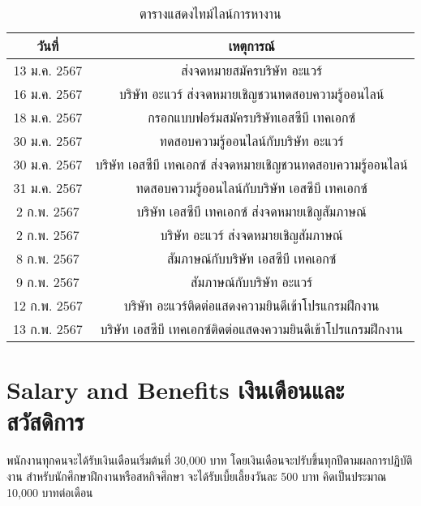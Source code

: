 \begin{table}[H]
    \centering
    \begin{tabular}{c||c}
        \textbf{วันที่} & \textbf{เหตุการณ์} \\ \hline
        13 ม.ค. 2567 & ส่งจดหมายสมัครบริษัท อะแวร์ \\ \hline
        16 ม.ค. 2567 & บริษัท อะแวร์ ส่งจดหมายเชิญชวนทดสอบความรู้ออนไลน์ \\\hline
        18 ม.ค. 2567 & กรอกแบบฟอร์มสมัครบริษัทเอสซีบี เทคเอกซ์ \\ \hline
        30 ม.ค. 2567 & ทดสอบความรู้ออนไลน์กับบริษัท อะแวร์ \\\hline
        30 ม.ค. 2567 & บริษัท เอสซีบี เทคเอกซ์ ส่งจดหมายเชิญชวนทดสอบความรู้ออนไลน์ \\\hline
        31 ม.ค. 2567 & ทดสอบความรู้ออนไลน์กับบริษัท เอสซีบี เทคเอกซ์ \\\hline
        2 ก.พ. 2567 & บริษัท เอสซีบี เทคเอกซ์ ส่งจดหมายเชิญสัมภาษณ์ \\ \hline
        2 ก.พ. 2567 & บริษัท อะแวร์ ส่งจดหมายเชิญสัมภาษณ์ \\ \hline
        8 ก.พ. 2567 & สัมภาษณ์กับบริษัท เอสซีบี เทคเอกซ์ \\ \hline
        9 ก.พ. 2567 & สัมภาษณ์กับบริษัท อะแวร์ \\ \hline
        12 ก.พ. 2567& บริษัท อะแวร์ติดต่อแสดงความยินดีเข้าโปรแกรมฝึกงาน \\ \hline
        13 ก.พ. 2567& บริษัท เอสซีบี เทคเอกซ์ติดต่อแสดงความยินดีเข้าโปรแกรมฝึกงาน \\
    \end{tabular}
    \caption{ตารางแสดงไทม์ไลน์การหางาน}
    \label{tab:job-finding-timeline}
\end{table}

\section{\ifenglish Salary and Benefits \else เงินเดือนและสวัสดิการ \fi}
พนักงานทุกคนจะได้รับเงินเดือนเริ่มต้นที่ 30,000 บาท โดยเงินเดือนจะปรับขึ้นทุกปีตามผลการปฏิบัติงาน สำหรับนักศึกษาฝึกงานหรือสหกิจศึกษา จะได้รับเบี้ยเลี้ยงวันละ 500 บาท คิดเป็นประมาณ 10,000 บาทต่อเดือน


